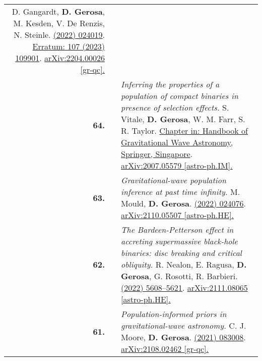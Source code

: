 {\begin{longtable}{rp{0.3cm}p{15.8cm}}
D. Gangardt, \textbf{D. Gerosa}, M. Kesden, V. De Renzis, N. Steinle.
\newline{}
\href{https://journals.aps.org/prd/abstract/10.1103/PhysRevD.106.024019}{\prd 106 (2022) 024019}. \href{https://journals.aps.org/prd/abstract/10.1103/PhysRevD.107.109901}{Erratum: 107 (2023) 109901}. \href{https://arxiv.org/abs/2204.00026}{arXiv:2204.00026 [gr-qc].}
\vspace{0.09cm}\\
%
\textbf{64.} & & \textit{Inferring the properties of a population of compact binaries in presence of selection effects.}
\newline{}
S. Vitale, \textbf{D. Gerosa}, W. M. Farr, S. R. Taylor.
\newline{}
\href{https://doi.org/10.1007/978-981-15-4702-7_45-1}{Chapter in: Handbook of Gravitational Wave Astronomy, Springer, Singapore}. \href{https://arxiv.org/abs/2007.05579}{arXiv:2007.05579 [astro-ph.IM].}
\vspace{0.09cm}\\
%
\textbf{63.} & & \textit{Gravitational-wave population inference at past time infinity.}
\newline{}
M. Mould, \textbf{D. Gerosa}.
\newline{}
\href{https://journals.aps.org/prd/abstract/10.1103/PhysRevD.104.083008}{\prd 105 (2022) 024076}. \href{https://arxiv.org/abs/2110.05507}{arXiv:2110.05507 [astro-ph.HE].}
\vspace{0.09cm}\\
%
\textbf{62.} & & \textit{The Bardeen-Petterson effect in accreting supermassive black-hole binaries: disc breaking and critical obliquity.}
\newline{}
R. Nealon, E. Ragusa, \textbf{D. Gerosa}, G. Rosotti, R. Barbieri.
\newline{}
\href{https://doi.org/10.1093/mnras/stab3328}{\mnras 509 (2022) 5608–5621}. \href{https://arxiv.org/abs/2111.08065}{arXiv:2111.08065 [astro-ph.HE].}
\vspace{0.09cm}\\
%
\textbf{61.} & & \textit{Population-informed priors in gravitational-wave astronomy.}
\newline{}
C. J. Moore, \textbf{D. Gerosa}.
\newline{}
\href{https://journals.aps.org/prd/abstract/10.1103/PhysRevD.104.083008}{\prd 104 (2021) 083008}. \href{https://arxiv.org/abs/2108.02462}{arXiv:2108.02462 [gr-qc].}
\vspace{0.09cm}\\

\end{longtable}}
